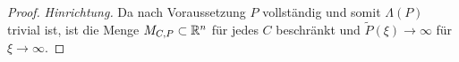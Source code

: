 \begin{proof}{\em Hinrichtung.}
Da nach Voraussetzung $P$ vollständig und somit $\Lambda(P)$ trivial ist, ist die Menge $M_{C,P}\subset\mathbb R^n$ für jedes $C$ beschränkt und $\widetilde P(\xi)\to \infty$ für $\xi\to\infty$.
\end{proof}



